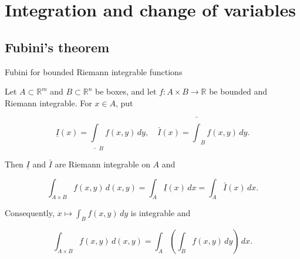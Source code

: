 \chapter{Integration and change of variables}

\section{Fubini's theorem}

\begin{theorem}{Fubini for bounded Riemann integrable functions}

Let \(A \subset \mathbb{R}^{m}\) and \(B \subset \mathbb{R}^{n}\) be boxes, and let \(f:A \times B\rightarrow\mathbb{R}\) be bounded and Riemann integrable. For \(x \in A\), put

\[\underline{I}(x) = {\underline{\int}}_{B}f\left( {x,y} \right)\, dy,\quad\bar{I}(x) = {\bar{\int}}_{B}f\left( {x,y} \right)\, dy.\]

Then \(\underline{I}\) and \(\bar{I}\) are Riemann integrable on \(A\) and

\[\int_{A \times B}f\left( {x,y} \right)\, d\left( {x,y} \right) = \int_{A}\underline{I}(x)\, dx = \int_{A}\bar{I}(x)\, dx.\]

Consequently, \(x\mapsto\int_{B}f\left( {x,y} \right)\, dy\) is integrable and

\[\int_{A \times B}f\left( {x,y} \right)\, d\left( {x,y} \right) = \int_{A}\left( {\int_{B}f\left( {x,y} \right)\, dy} \right)\, dx.\]

\end{theorem}


